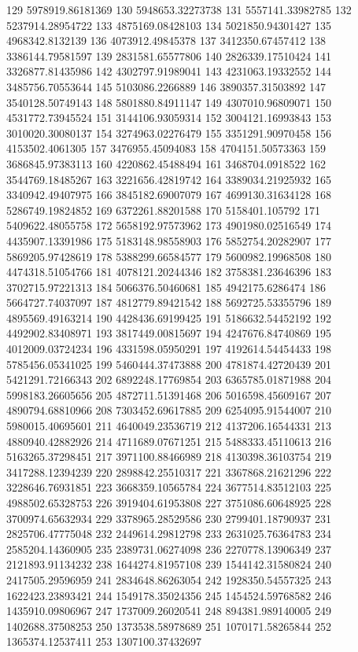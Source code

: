 {129 5978919.86181369
130 5948653.32273738
131 5557141.33982785
132 5237914.28954722
133 4875169.08428103
134 5021850.94301427
135 4968342.8132139
136 4073912.49845378
137 3412350.67457412
138 3386144.79581597
139 2831581.65577806
140 2826339.17510424
141 3326877.81435986
142 4302797.91989041
143 4231063.19332552
144 3485756.70553644
145 5103086.2266889
146 3890357.31503892
147 3540128.50749143
148 5801880.84911147
149 4307010.96809071
150 4531772.73945524
151 3144106.93059314
152 3004121.16993843
153 3010020.30080137
154 3274963.02276479
155 3351291.90970458
156 4153502.4061305
157 3476955.45094083
158 4704151.50573363
159 3686845.97383113
160 4220862.45488494
161 3468704.0918522
162 3544769.18485267
163 3221656.42819742
164 3389034.21925932
165 3340942.49407975
166 3845182.69007079
167 4699130.31634128
168 5286749.19824852
169 6372261.88201588
170 5158401.105792
171 5409622.48055758
172 5658192.97573962
173 4901980.02516549
174 4435907.13391986
175 5183148.98558903
176 5852754.20282907
177 5869205.97428619
178 5388299.66584577
179 5600982.19968508
180 4474318.51054766
181 4078121.20244346
182 3758381.23646396
183 3702715.97221313
184 5066376.50460681
185 4942175.6286474
186 5664727.74037097
187 4812779.89421542
188 5692725.53355796
189 4895569.49163214
190 4428436.69199425
191 5186632.54452192
192 4492902.83408971
193 3817449.00815697
194 4247676.84740869
195 4012009.03724234
196 4331598.05950291
197 4192614.54454433
198 5785456.05341025
199 5460444.37473888
200 4781874.42720439
201 5421291.72166343
202 6892248.17769854
203 6365785.01871988
204 5998183.26605656
205 4872711.51391468
206 5016598.45609167
207 4890794.68810966
208 7303452.69617885
209 6254095.91544007
210 5980015.40695601
211 4640049.23536719
212 4137206.16544331
213 4880940.42882926
214 4711689.07671251
215 5488333.45110613
216 5163265.37298451
217 3971100.88466989
218 4130398.36103754
219 3417288.12394239
220 2898842.25510317
221 3367868.21621296
222 3228646.76931851
223 3668359.10565784
224 3677514.83512103
225 4988502.65328753
226 3919404.61953808
227 3751086.60648925
228 3700974.65632934
229 3378965.28529586
230 2799401.18790937
231 2825706.47775048
232 2449614.29812798
233 2631025.76364783
234 2585204.14360905
235 2389731.06274098
236 2270778.13906349
237 2121893.91134232
238 1644274.81957108
239 1544142.31580824
240 2417505.29596959
241 2834648.86263054
242 1928350.54557325
243 1622423.23893421
244 1549178.35024356
245 1454524.59768582
246 1435910.09806967
247 1737009.26020541
248 894381.989140005
249 1402688.37508253
250 1373538.58978689
251 1070171.58265844
252 1365374.12537411
253 1307100.37432697
}
